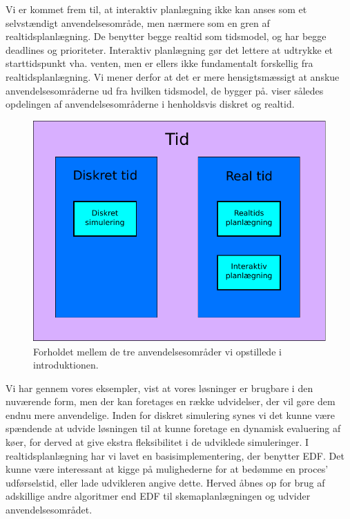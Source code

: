 Vi er kommet frem til, at interaktiv planlægning ikke kan anses som et selvstændigt anvendelsesområde, men nærmere som en gren af realtidsplanlægning. De benytter begge realtid som tidsmodel, og har begge deadlines og prioriteter. Interaktiv planlægning gør det lettere at udtrykke et starttidspunkt vha. venten, men er ellers ikke fundamentalt forskellig fra realtidsplanlægning. Vi mener derfor at det er mere hensigtsmæssigt at anskue anvendelsesområderne ud fra hvilken tidsmodel, de bygger på.  viser således opdelingen af anvendelsesområderne i henholdsvis diskret og realtid.

\begin{figure}[htp]
 \begin{center}
  \includegraphics[scale=0.6]{images/timemodel}
	\caption{Forholdet mellem de tre anvendelsesområder vi opstillede i introduktionen.}
	\label{fig:timemodel}
\end{center}
\end{figure}


Vi har gennem vores eksempler, vist at vores løsninger er brugbare i den nuværende form, men der kan foretages en række udvidelser, der vil gøre dem endnu mere anvendelige. 
Inden for diskret simulering synes vi det kunne være spændende at udvide løsningen til at kunne foretage en dynamisk evaluering af køer, for derved at give ekstra fleksibilitet i de udviklede simuleringer. I realtidsplanlægning har vi lavet en basisimplementering, der benytter EDF. Det kunne være interessant at kigge på mulighederne for at bedømme en proces' udførselstid, eller lade udvikleren angive dette. Herved åbnes op for brug af adskillige andre algoritmer end EDF til skemaplanlægningen og udvider anvendelsesområdet.  







